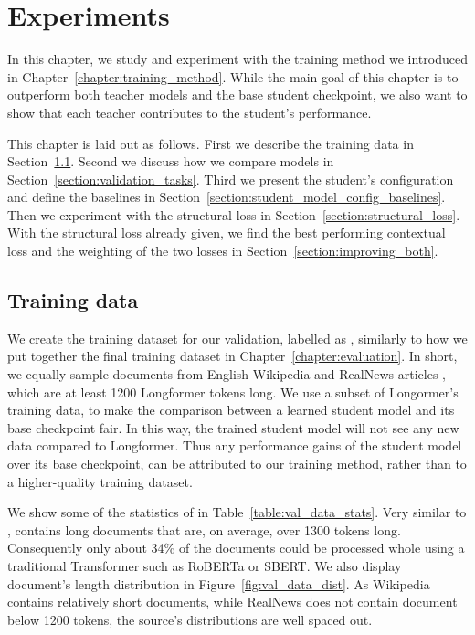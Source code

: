 \chapter{Experiments}\label{chapter:experiments}

In this chapter, we study and experiment with the training method we introduced
in Chapter~\ref{chapter:training_method}. While the main goal of this chapter
is to outperform both teacher models and the base student checkpoint, we also
want to show that each teacher contributes to the student's performance.

This chapter is laid out as follows. First we describe the training data in
Section~\ref{section:val_training_data}. Second we discuss how we compare
models in Section~\ref{section:validation_tasks}. Third we present the
student's configuration and define the baselines in
Section~\ref{section:student_model_config_baselines}. Then we experiment with
the structural loss in Section~\ref{section:structural_loss}. With the
structural loss already given, we find the best performing contextual loss and
the weighting of the two losses in Section~\ref{section:improving_both}.

\section{Training data}\label{section:val_training_data}

We create the training dataset for our validation, labelled as
, similarly to how we put together the final training
dataset  in Chapter~\ref{chapter:evaluation}. In short,
we equally sample documents from English Wikipedia and RealNews articles
\citep{zellers2019defending}, which are at least 1200 Longformer tokens long.
We use a subset of Longormer's training data, to make the comparison between a
learned student model and its base checkpoint fair. In this way, the trained
student model will not see any new data compared to Longformer. Thus any
performance gains of the student model over its base checkpoint, can be
attributed to our training method, rather than to a higher-quality training
dataset.

We show some of the statistics of  in
Table~\ref{table:val_data_stats}. Very similar to ,
 contains long documents that are, on average, over 1300
tokens long. Consequently only about 34\% of the documents could be processed
whole using a traditional Transformer such as RoBERTa \citep{liu2019roberta} or
SBERT. We also display document's length distribution in
Figure~\ref{fig:val_data_dist}. As Wikipedia contains relatively short documents,
while RealNews does not contain document below 1200 tokens, the source's
distributions are well spaced out.


